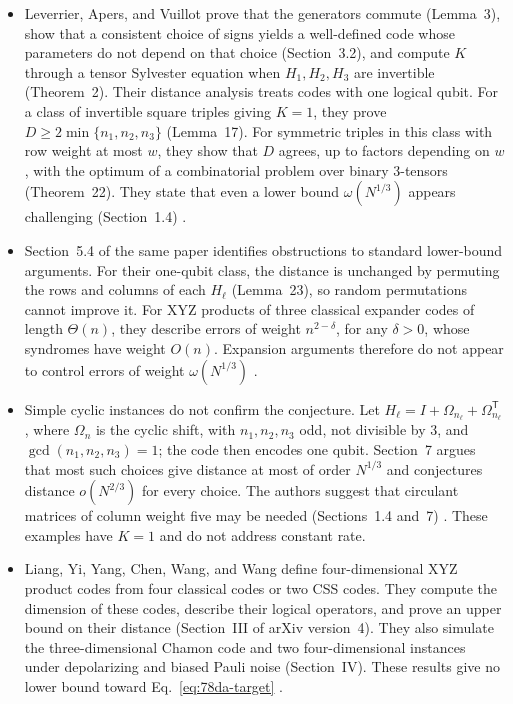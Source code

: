 \begin{itemize}
  \item Leverrier, Apers, and Vuillot prove that the generators commute (Lemma~3), show that a consistent choice of signs yields a well-defined code whose parameters do not depend on that choice (Section~3.2), and compute $K$ through a tensor Sylvester equation when $H_1,H_2,H_3$ are invertible (Theorem~2). Their distance analysis treats codes with one logical qubit. For a class of invertible square triples giving $K=1$, they prove $D\geq2\min\{n_1,n_2,n_3\}$ (Lemma~17). For symmetric triples in this class with row weight at most $w$, they show that $D$ agrees, up to factors depending on $w$, with the optimum of a combinatorial problem over binary 3-tensors (Theorem~22). They state that even a lower bound $\omega(N^{1/3})$ appears challenging (Section~1.4) .

  \item Section~5.4 of the same paper identifies obstructions to standard lower-bound arguments. For their one-qubit class, the distance is unchanged by permuting the rows and columns of each $H_\ell$ (Lemma~23), so random permutations cannot improve it. For XYZ products of three classical expander codes of length $\Theta(n)$, they describe errors of weight $n^{2-\delta}$, for any $\delta>0$, whose syndromes have weight $O(n)$. Expansion arguments therefore do not appear to control errors of weight $\omega(N^{1/3})$ .

  \item Simple cyclic instances do not confirm the conjecture. Let $H_\ell=I+\Omega_{n_\ell}+\Omega_{n_\ell}^{\mathsf T}$, where $\Omega_n$ is the cyclic shift, with $n_1,n_2,n_3$ odd, not divisible by $3$, and $\gcd(n_1,n_2,n_3)=1$; the code then encodes one qubit. Section~7 argues that most such choices give distance at most of order $N^{1/3}$ and conjectures distance $o(N^{2/3})$ for every choice. The authors suggest that circulant matrices of column weight five may be needed (Sections~1.4 and~7) . These examples have $K=1$ and do not address constant rate.

  \item Liang, Yi, Yang, Chen, Wang, and Wang define four-dimensional XYZ product codes from four classical codes or two CSS codes. They compute the dimension of these codes, describe their logical operators, and prove an upper bound on their distance (Section~III of arXiv version~4). They also simulate the three-dimensional Chamon code and two four-dimensional instances under depolarizing and biased Pauli noise (Section~IV). These results give no lower bound toward Eq.~\eqref{eq:78da-target} .


\end{itemize}
